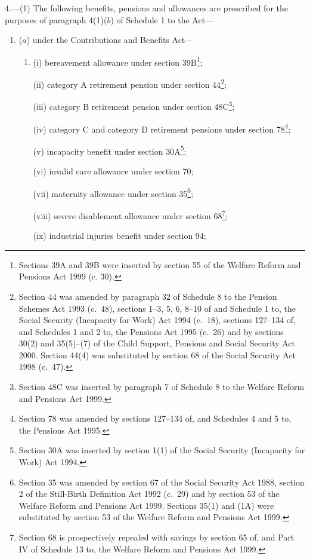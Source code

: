 \documentclass[12pt,a4paper]{article}
\begin{document}
4.---(1)  The following benefits, pensions and allowances are prescribed for the purposes of paragraph 4(1)($b$)  of Schedule 1 to the Act—
\begin{enumerate}\item[]
($a$) under the Contributions and Benefits Act—
\begin{enumerate}\item[]
(i) bereavement allowance under section 39B\footnote{\frenchspacing Sections 39A and 39B were inserted by section 55 of the Welfare Reform and Pensions Act 1999 (c. 30).};

(ii) category A retirement pension under section 44\footnote{Section 44 was amended by paragraph 32 of Schedule 8 to the Pension Schemes Act 1993 (c.\ 48), sections 1–3, 5, 6, 8–10 of and Schedule 1 to, the Social Security (Incapacity for Work) Act 1994 (c.\ 18), sections 127–134 of, and Schedules 1 and 2 to, the Pensions Act 1995 (c.\ 26) and by sections 30(2) and 35(5)–(7) of the Child Support, Pensions and Social Security Act 2000. Section 44(4) was substituted by section 68 of the Social Security Act 1998 (c.\ 47).};

(iii) category B retirement pension under section 48C\footnote{Section 48C was inserted by paragraph 7 of Schedule 8 to the Welfare Reform and Pensions Act 1999.};

(iv) category C and category D retirement pensions under section 78\footnote{Section 78 was amended by sections 127–134 of, and Schedules 4 and 5 to, the Pensions Act 1995.};

(v) incapacity benefit under section 30A\footnote{Section 30A was inserted by section 1(1) of the Social Security (Incapacity for Work) Act 1994.};

(vi) invalid care allowance under section 70;

(vii) maternity allowance under section 35\footnote{Section 35 was amended by section 67 of the Social Security Act 1988, section 2 of the Still-Birth Definition Act 1992 (c.\ 29) and by section 53 of the Welfare Reform and Pensions Act 1999. Sections 35(1) and (1A) were substituted by section 53 of the Welfare Reform and Pensions Act 1999.};

(viii) severe disablement allowance under section 68\footnote{Section 68 is prospectively repealed with savings by section 65 of, and Part IV of Schedule 13 to, the Welfare Reform and Pensions Act 1999.};

(ix) industrial injuries benefit under section 94;


\end{enumerate}
\end{enumerate}
\end{document}
